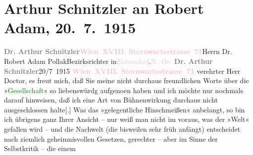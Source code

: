 

               \section[Arthur Schnitzler an Robert Adam, 20. 7. 1915]{ Arthur Schnitzler an Robert Adam, 20. 7. 1915}\nopagebreak{}\rehead{ }\normalsize\beginnumbering{} \toendnotes[C]{\smallbreak\pagebreak[2]} 
\pstart{}{\pb}\textcolor{gray}{\textbf{Dr. Arthur Schnitzler}}\pend{}\pstart{}\textcolor{gray}{\textbf{\textcolor{pink}{Wien XVIII. Sternwartestrasse 71}{}\ledrightnote{\textcolor{pink}{Sternwartestraße}}}}\pend{}{\bigskip}\pstart{}{\pb}Herrn Dr. Robert Adam
                        Pollak\pend{}\pstart{}Bezirksrichter in\pend{}\pstart{}\textcolor{pink}{Zistersdorf}{}\ledrightnote{\textcolor{pink}{Zistersdorf}}.\pend{}\pstart{}\textcolor{pink}{N. Oe.}{}\ledrightnote{\textcolor{pink}{Niederösterreich}}\pend{}{\bigskip}\pstart
           \noindent{}{\pb}\textcolor{gray}{\textbf{Dr. Arthur Schnitzler}}\hfill 20/7 1915\pend
           \pstart
           \textcolor{gray}{\textbf{\textcolor{pink}{Wien XVIII. Sternwartestrasse 71}{}\ledrightnote{\textcolor{pink}{Sternwartestraße}}}}\pend
           \pstart
           verehrter Herr Doctor, es freut mich, daß Sie meine nicht
                    durchaus freundlichen Worte über die »\textcolor{green}{Gesellschaft}{}\ledrightnote{\textcolor{green}{Gesellschaft [Eine Gaunerkomödie]}}« so liebenswürdg aufgeno{\geminationm}en
                    haben und ich möchte nur nochmals darauf hinweisen, daß ich eine Art von
                    Bühnenwirkung durchaus nicht ausgeschlossen halte{[}.{]} Was das
                    »gelegentliche Hinschmeißen« anbelangt, so bin ich übrigens ganz Ihrer Ansicht –
                    nur weiß man nicht im voraus, was der »Welt« gefallen wird – und die Nachwelt
                    (die bisweilen sehr früh anfängt) ent{\pb}scheidet nach ziemlich
                    geheimnisvollen Gesetzen, gerechter – aber im Sinne der Selbstkritik – die einem

